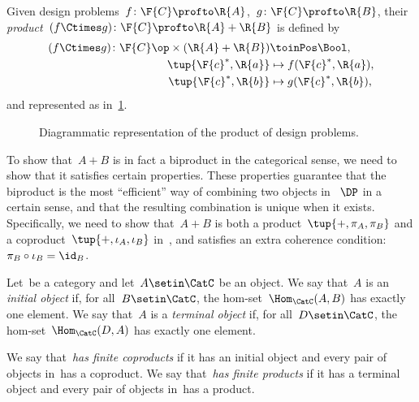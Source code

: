 \begin{definition}
    \label{def:product-dp}
    Given design problems~$f\colon \F{C} \profto \R{A}$,~$g \colon \F{C} \profto \R{B}$, their \emph{product}~$(f \Ctimes g)\colon \F{C} \profto \R{A} + \R{B}$ is defined by
    \begin{equation}
        \begin{aligned}
            (f \Ctimes g)
            \colon \F{C}\op  \times (\R{A} + \R{B}) & \toinPos \Bool, \\
            \tup{\F{c}^*, \R{a}}                    & \mapsto f(\F{c}^*, \R{a}), \\
            \tup{\F{c}^*, \R{b}}                    & \mapsto g(\F{c}^*, \R{b}),
        \end{aligned}
    \end{equation}
    and represented as in~\cref{fig:productdp}.
\end{definition}

\begin{figure}[h!]
    \begin{center}
    \end{center}
    \caption{Diagrammatic representation of the product of design problems. }
    \label{fig:productdp}
\end{figure}

To show that~$A + B$ is in fact a biproduct in the categorical sense, we need to show that it satisfies certain properties.
These properties guarantee that the biproduct is the most ``efficient'' way of combining two objects in~$~\DP$ in a certain sense, and that the resulting combination is unique when it exists.
Specifically, we need to show that~$A + B$ is both a product~$\tup{+, \pi_A, \pi_B}$ and a coproduct~$\tup{+, \iota_A, \iota_B}$ in~\DP, and satisfies an extra coherence condition:~$\pi_B \circ \iota_B = \id_B$.

\begin{ctdefinition}
    Let~\CatC be a category and let~$A \setin \CatC$ be an object.
    We say that~$A$ is an \emph{initial object} if, for all~$B \setin\CatC$, the hom-set~$\Hom_\CatC(A,B)$ has exactly one element.
    We say that~$A$ is a \emph{terminal object} if, for all~$D\setin\CatC$, the hom-set~$\Hom_\CatC(D,A)$ has exactly one element.
\end{ctdefinition}

\begin{ctdefinition}
    We say that~\CatC \emph{has finite coproducts} if it has an initial object and every pair of objects in~\CatC has a coproduct.
    We say that~\CatC \emph{has finite products} if it has a terminal object and every pair of objects in~\CatC has a product.
\end{ctdefinition}

